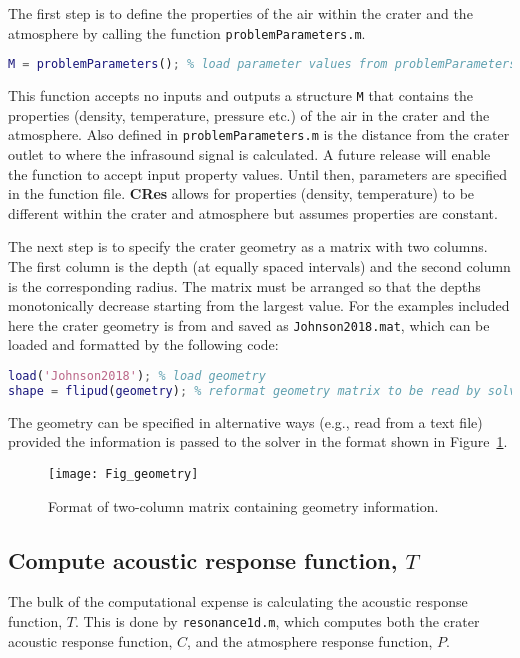 \documentclass[10pt]{article}
\begin{document}
The first step is to define the properties of the air within the crater and the atmosphere by calling the function \texttt{problemParameters.m}. 
\begin{lstlisting}[language=Matlab]
M = problemParameters(); % load parameter values from problemParameters.m
\end{lstlisting}
This function accepts no inputs and outputs a structure \texttt{M} that contains the properties (density, temperature, pressure etc.) of the air in the crater and the atmosphere. Also defined in \texttt{problemParameters.m} is the distance from the crater outlet to where the infrasound signal is calculated. A future release will enable the function to accept input property values. Until then, parameters are specified in the function file. {\bf CRes} allows for properties (density, temperature) to be different within the crater and atmosphere but assumes properties are constant.

The next step is to specify the crater geometry as a matrix with two columns. The first column is the depth (at equally spaced intervals) and the second column is the corresponding radius. The matrix must be arranged so that the depths monotonically decrease starting from the largest value. For the examples included here the crater geometry is from \citet{Johnson2018_Villarrica} and saved as \texttt{Johnson2018.mat}, which can be loaded and formatted by the following code:
\begin{lstlisting}[language=Matlab]
load('Johnson2018'); % load geometry
shape = flipud(geometry); % reformat geometry matrix to be read by solver
\end{lstlisting}
The geometry can be specified in alternative ways (e.g., read from a text file) provided the information is passed to the solver in the format shown in Figure~\ref{fig:geometry}.

\begin{figure}[h!]
\centering
\texttt{[image: Fig\_geometry]}
\caption{Format of two-column matrix containing geometry information.}
\label{fig:geometry}
\end{figure}

\subsection{Compute acoustic response function, $T$}
The bulk of the computational expense is calculating the acoustic response function, $T$. This is done by \texttt{resonance1d.m}, which computes both the crater acoustic response function, $C$, and the atmosphere response function, $P$.
\end{document}
